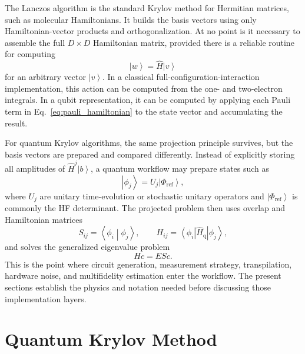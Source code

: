\documentclass[11pt]{article}
\newcommand{\ket}[1]{\left|#1\right\rangle}
\newcommand{\bra}[1]{\left\langle#1\right|}
\newcommand{\braket}[2]{\left\langle#1\middle|#2\right\rangle}
\begin{document}
The Lanczos algorithm is the standard Krylov method for Hermitian matrices, such as molecular Hamiltonians.  It builds the basis vectors using only Hamiltonian-vector products and orthogonalization.  At no point is it necessary to assemble the full $D\times D$ Hamiltonian matrix, provided there is a reliable routine for computing
\begin{equation}
    \ket{w}=\hat{H}\ket{v}
\end{equation}
for an arbitrary vector $\ket{v}$.  In a classical full-configuration-interaction implementation, this action can be computed from the one- and two-electron integrals.  In a qubit representation, it can be computed by applying each Pauli term in Eq.~\eqref{eq:pauli_hamiltonian} to the state vector and accumulating the result.

For quantum Krylov algorithms, the same projection principle survives, but the basis vectors are prepared and compared differently.  Instead of explicitly storing all amplitudes of $\hat{H}^j\ket{b}$, a quantum workflow may prepare states such as
\begin{equation}
    \ket{\phi_j}=U_j\ket{\Phi_{\mathrm{ref}}},
\end{equation}
where $U_j$ are unitary time-evolution or stochastic unitary operators and $\ket{\Phi_{\mathrm{ref}}}$ is commonly the HF determinant.  The projected problem then uses overlap and Hamiltonian matrices
\begin{equation}
    S_{ij}=\braket{\phi_i}{\phi_j},
    \qquad
    H_{ij}=\bra{\phi_i}\hat{H}_{\mathrm{q}}\ket{\phi_j},
\end{equation}
and solves the generalized eigenvalue problem
\begin{equation}
    Hc = ESc.
\end{equation}
This is the point where circuit generation, measurement strategy, transpilation, hardware noise, and multifidelity estimation enter the workflow.  The present sections establish the physics and notation needed before discussing those implementation layers.

\section{Quantum Krylov Method}
\end{document}
